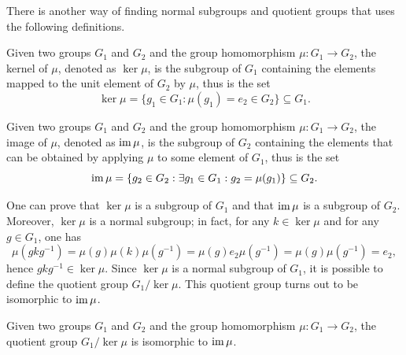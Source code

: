 There is another way of finding normal subgroups and quotient groups that uses the following definitions.
\begin{defn}
\label{defn: kernel of a group homomorphism}
    Given two groups $G_1$ and $G_2$ and the group homomorphism $\mu : G_1 \to G_2$, the kernel of $\mu$, denoted as $\ker{\mu}$, is the subgroup of $G_1$ containing the elements mapped to the unit element of $G_2$ by $\mu$, thus is the set
    \begin{equation}
        \ker{\mu} = \{g_1 \in G_1 : \mu(g_1) = e_2 \in G_2\} \subseteq G_1.
    \end{equation}
\end{defn}
\begin{defn}
\label{defn: image of a group homomorphism}
    Given two groups $G_1$ and $G_2$ and the group homomorphism $\mu : G_1 \to G_2$, the image of $\mu$, denoted as $\mathrm{im}\,{\mu}$, is the subgroup of $G_2$ containing the elements that can be obtained by applying $\mu$ to some element of $G_1$, thus is the set
    \begin{equation}
        \mathrm{im}\,{\mu} = \{g_2 \in G_2 : \exists g_1 \in G_1 : g_2 = \mu(g_1)\} \subseteq G_2.
    \end{equation}
\end{defn}
One can prove that $\ker{\mu}$ is a subgroup of $G_1$ and that $\mathrm{im}\,{\mu}$ is a subgroup of $G_2$. Moreover, $\ker{\mu}$ is a normal subgroup; in fact, for any $k \in \ker{\mu}$ and for any $g \in G_1$, one has
\begin{equation}
    \mu(gkg^{-1}) = \mu(g)\mu(k)\mu(g^{-1}) = \mu(g)e_2\mu(g^{-1}) = \mu(g)\mu(g^{-1}) = e_2,
\end{equation}
hence $gkg^{-1} \in \ker{\mu}$. Since $\ker{\mu}$ is a normal subgroup of $G_1$, it is possible to define the quotient group $G_1/\ker{\mu}$. This quotient group turns out to be isomorphic to $\mathrm{im}\,{\mu}$. 
\begin{teo}
\label{teo: G/ker - im isomorphic relation}
    Given two groups $G_1$ and $G_2$ and the group homomorphism $\mu : G_1 \to G_2$, the quotient group $G_1/\ker{\mu}$ is isomorphic to $\mathrm{im}\,{\mu}$.
\end{teo}
